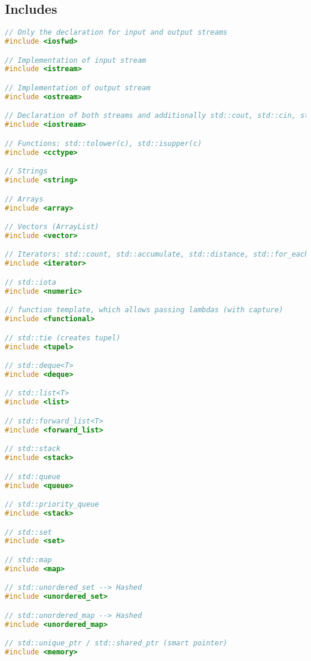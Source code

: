 
\subsection{Includes}
\begin{lstlisting}[style=frame, style= linenumbers, language=C]
// Only the declaration for input and output streams
#include <iosfwd>

// Implementation of input stream
#include <istream>

// Implementation of output stream
#include <ostream>

// Declaration of both streams and additionally std::cout, std::cin, std::cerr
#include <iostream>

// Functions: std::tolower(c), std::isupper(c)
#include <cctype>

// Strings
#include <string>

// Arrays
#include <array>

// Vectors (ArrayList)
#include <vector>

// Iterators: std::count, std::accumulate, std::distance, std::for_each
#include <iterator>

// std::iota
#include <numeric>

// function template, which allows passing lambdas (with capture)
#include <functional>

// std::tie (creates tupel)
#include <tupel>

// std::deque<T>
#include <deque>

// std::list<T>
#include <list>

// std::forward_list<T>
#include <forward_list>

// std::stack
#include <stack>

// std::queue
#include <queue>

// std::priority_queue
#include <stack>

// std::set
#include <set>

// std::map
#include <map>

// std::unordered_set --> Hashed
#include <unordered_set>

// std::unordered_map --> Hashed
#include <unordered_map>

// std::unique_ptr / std::shared_ptr (smart pointer)
#include <memory>
\end{lstlisting}